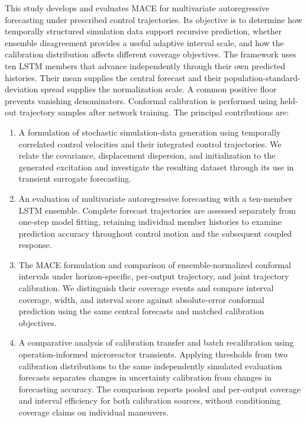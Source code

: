 This study develops and evaluates MACE for multivariate autoregressive forecasting under prescribed control trajectories. Its objective is to determine how temporally structured simulation data support recursive prediction, whether ensemble disagreement provides a useful adaptive interval scale, and how the calibration distribution affects different coverage objectives. The framework uses ten LSTM members that advance independently through their own predicted histories. Their mean supplies the central forecast and their population-standard-deviation spread supplies the normalization scale. A common positive floor prevents vanishing denominators. Conformal calibration is performed using held-out trajectory samples after network training. The principal contributions are:
\begin{enumerate}
 \item A formulation of stochastic simulation-data generation using temporally correlated control velocities and their integrated control trajectories. We relate the covariance, displacement dispersion, and initialization to the generated excitation and investigate the resulting dataset through its use in transient surrogate forecasting.
 \item An evaluation of multivariate autoregressive forecasting with a ten-member LSTM ensemble. Complete forecast trajectories are assessed separately from one-step model fitting, retaining individual member histories to examine prediction accuracy throughout control motion and the subsequent coupled response.
 \item The MACE formulation and comparison of ensemble-normalized conformal intervals under horizon-specific, per-output trajectory, and joint trajectory calibration. We distinguish their coverage events and compare interval coverage, width, and interval score against absolute-error conformal prediction using the same central forecasts and matched calibration objectives.
 \item A comparative analysis of calibration transfer and batch recalibration using operation-informed microreactor transients. Applying thresholds from two calibration distributions to the same independently simulated evaluation forecasts separates changes in uncertainty calibration from changes in forecasting accuracy. The comparison reports pooled and per-output coverage and interval efficiency for both calibration sources, without conditioning coverage claims on individual maneuvers.
\end{enumerate}

